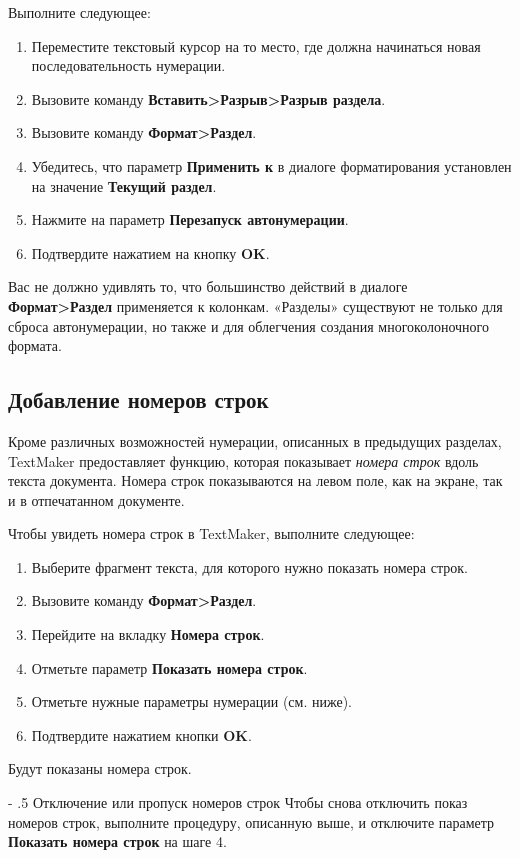 ﻿\documentclass[a4paper,10pt]{article}
\makeatletter
\renewcommand\paragraph{%
   \@startsection{paragraph}{4}{0mm}%
      {-\baselineskip}%
      {.5\baselineskip}%
      {\normalfont\normalsize\bfseries}}
\makeatother
\begin{document}
Выполните следующее:
\begin{enumerate}
 \item Переместите текстовый курсор на то место, где должна начинаться новая последовательность нумерации.
 \item Вызовите команду \textbf{Вставить>Разрыв>Разрыв раздела}.
 \item Вызовите команду \textbf{Формат>Раздел}.
 \item Убедитесь, что параметр \textbf{Применить к} в диалоге форматирования установлен на значение \textbf{Текущий раздел}.
 \item Нажмите на параметр \textbf{Перезапуск автонумерации}.
 \item Подтвердите нажатием на кнопку \textbf{OK}.
\end{enumerate}

Вас не должно удивлять то, что большинство действий в диалоге \textbf{Формат>Раздел} применяется к колонкам. «Разделы» существуют не только для сброса автонумерации, но также и для облегчения создания многоколоночного формата.

\subsection{Добавление номеров строк} \label{sec:добавлномеровстрок}
Кроме различных возможностей нумерации, описанных в предыдущих разделах, TextMaker предоставляет функцию, которая показывает \textit{номера строк} вдоль текста документа. Номера строк показываются на левом поле, как на экране, так и в отпечатанном документе.

Чтобы увидеть номера строк в TextMaker, выполните следующее:
\begin{enumerate}
 \item Выберите фрагмент текста, для которого нужно показать номера строк.
 \item Вызовите команду \textbf{Формат>Раздел}.
 \item Перейдите на вкладку \textbf{Номера строк}.
 \item Отметьте параметр \textbf{Показать номера строк}.
 \item Отметьте нужные параметры нумерации (см. ниже).
 \item Подтвердите нажатием кнопки \textbf{OK}.
\end{enumerate}

Будут показаны номера строк.

\paragraph{Отключение или пропуск номеров строк}
Чтобы снова отключить показ номеров строк, выполните процедуру, описанную выше, и отключите параметр \textbf{Показать номера строк} на шаге 4.
\end{document}
